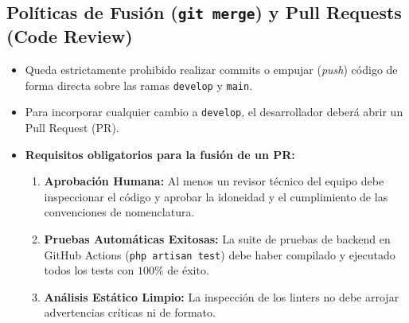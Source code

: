 \subsection{Políticas de Fusión (\texttt{git merge}) y Pull Requests (Code Review)}
\begin{itemize}
    \item Queda estrictamente prohibido realizar commits o empujar (\textit{push}) código de forma directa sobre las ramas \texttt{develop} y \texttt{main}.
    
    \item Para incorporar cualquier cambio a \texttt{develop}, el desarrollador deberá abrir un Pull Request (PR).
    
    \item \textbf{Requisitos obligatorios para la fusión de un PR:}
    \begin{enumerate}
        \item \textbf{Aprobación Humana:} Al menos un revisor técnico del equipo debe inspeccionar el código y aprobar la idoneidad y el cumplimiento de las convenciones de nomenclatura.
        \item \textbf{Pruebas Automáticas Exitosas:} La suite de pruebas de backend en GitHub Actions (\texttt{php artisan test}) debe haber compilado y ejecutado todos los tests con $100\%$ de éxito.
        \item \textbf{Análisis Estático Limpio:} La inspección de los linters no debe arrojar advertencias críticas ni de formato.
    \end{enumerate}
\end{itemize}